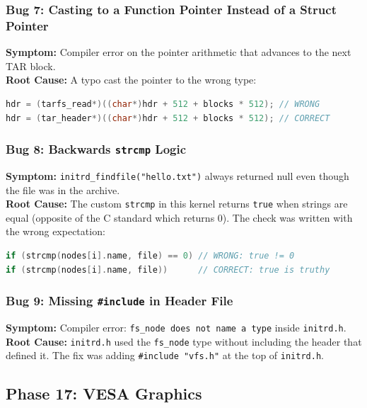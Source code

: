 \documentclass[12pt,a4paper]{report}
\begin{document}
\subsubsection*{Bug 7: Casting to a Function Pointer Instead of a Struct Pointer}
\textbf{Symptom:} Compiler error on the pointer arithmetic that advances to the next TAR block.\\
\textbf{Root Cause:} A typo cast the pointer to the wrong type:
\begin{lstlisting}[language=C++]
hdr = (tarfs_read*)((char*)hdr + 512 + blocks * 512); // WRONG
hdr = (tar_header*)((char*)hdr + 512 + blocks * 512); // CORRECT
\end{lstlisting}

\subsubsection*{Bug 8: Backwards \texttt{strcmp} Logic}
\textbf{Symptom:} \texttt{initrd\_findfile("hello.txt")} always returned null even though the file was in the archive.\\
\textbf{Root Cause:} The custom \texttt{strcmp} in this kernel returns \texttt{true} when strings are equal (opposite of the C standard which returns 0). The check was written with the wrong expectation:
\begin{lstlisting}[language=C++]
if (strcmp(nodes[i].name, file) == 0) // WRONG: true != 0
if (strcmp(nodes[i].name, file))      // CORRECT: true is truthy
\end{lstlisting}

\subsubsection*{Bug 9: Missing \texttt{\#include} in Header File}
\textbf{Symptom:} Compiler error: \texttt{fs\_node does not name a type} inside \texttt{initrd.h}.\\
\textbf{Root Cause:} \texttt{initrd.h} used the \texttt{fs\_node} type without including the header that defined it. The fix was adding \texttt{\#include "vfs.h"} at the top of \texttt{initrd.h}.

\subsection*{Phase 17: VESA Graphics}
\end{document}
